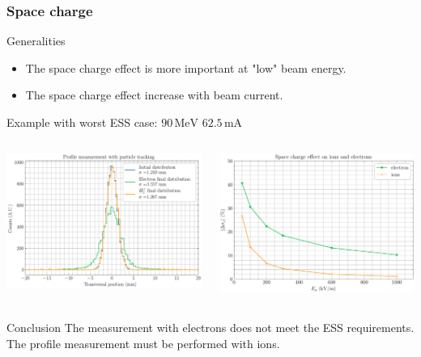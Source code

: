\begin{frame}
  \frametitle{Space charge}
  \begin{block}{Generalities}
    \begin{itemize}
      \item The space charge effect is more important at "low" beam energy.
      \item The space charge effect increase with beam current.
    \end{itemize}
  \end{block}
  Example with worst ESS case: $90\,\mathrm{MeV}$ $62.5\,\mathrm{mA}$
  \begin{columns}
    \begin{column}{0.45\textwidth}
      \includegraphics[width=\textwidth]{03_SIM/fig/fig000_SC2_fr}
    \end{column}
    \begin{column}{0.45\textwidth}
      \includegraphics[width=\textwidth]{03_SIM/fig/fig000_SC_ions_electrons}
    \end{column}
  \end{columns}
  \begin{alertblock}{Conclusion}
    The measurement with electrons does not meet the ESS requirements.
    The profile measurement must be performed with ions.
  \end{alertblock}
\end{frame}

